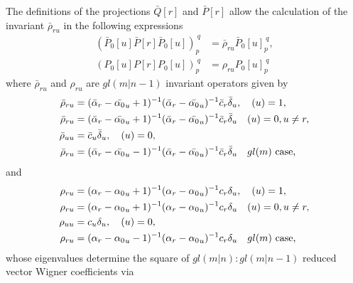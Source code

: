 \documentclass[12pt]{article}
\def\nn{\nonumber}
\begin{document}
The definitions of the projections $\bar{Q}[r]$ and $\bar{P}[r]$ allow the calculation of the invariant $\bar{\rho}_{ru}$ in the following expressions \cite{GIW2}
\begin{align}
(\bar{P}_0[u]\bar{P}[r]\bar{P}_0[u])_p^{\ q} &= \bar{\rho}_{ru}\bar{P}_0[u]_p^{\ q},\\
({P_0}[u]{P}[r]{P_0}[u])_p^{\ q} &= {\rho}_{ru}{P_0}[u]_p^{\ q}
\end{align}
where $\bar{\rho}_{ru}$ and ${\rho}_{ru}$ are $gl(m|n-1)$ invariant operators given by
\begin{align}
\bar{\rho}_{ru} &= (\bar{\alpha}_r-\bar{\alpha_0}_u +
1)^{-1}(\bar{\alpha}_r-\bar{\alpha_0}_u)^{-1}\bar{c}_r\bar{\delta}_u, \ \ \ (u) = 1, \nn\\
\bar{\rho}_{ru} &= (\bar{\alpha}_r-\bar{\alpha_0}_u +
1)^{-1}(\bar{\alpha}_r-\bar{\alpha_0}_u)^{-1}\bar{c}_r\bar{\delta}_u \ \ \ (u) = 0, u \neq r,
\nn\\
\bar{\rho}_{uu} &= \bar{c}_u \bar{\delta}_u, \ \ \ (u) = 0, \nn\\
\bar{\rho}_{ru} &= (\bar{\alpha}_r-\bar{\alpha_0}_u -
1)^{-1}(\bar{\alpha}_r-\bar{\alpha_0}_u)^{-1}\bar{c}_r \bar{\delta}_u \ \ \ gl(m)
\hbox{~case,} 
\label{RhoBarExp}
\end{align}
and
\begin{align}
{\rho}_{ru} &= ({\alpha}_r-{\alpha_0}_u +
1)^{-1}({\alpha}_r-{\alpha_0}_u)^{-1}{c}_r{\delta}_u, \ \ \ (u) = 1, \nn\\
{\rho}_{ru} &= ({\alpha}_r-{\alpha_0}_u +
1)^{-1}({\alpha}_r-{\alpha_0}_u)^{-1}{c}_r{\delta}_u \ \ \ (u) = 0, u \neq r,
\nn\\
{\rho}_{uu} &= {c}_u {\delta}_u, \ \ \ (u) = 0, \nn\\
{\rho}_{ru} &= ({\alpha}_r-{\alpha_0}_u -
1)^{-1}({\alpha}_r-{\alpha_0}_u)^{-1}{c}_r {\delta}_u \ \ \ gl(m)
\hbox{~case,} 
\label{RhoExp}
\end{align}
whose eigenvalues determine the square of $gl(m|n):gl(m|n-1)$ reduced vector Wigner
coefficients via
\end{document}
